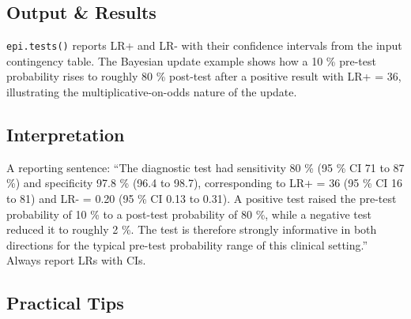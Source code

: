 \documentclass[
]{article}
\begin{document}
\subsection{Output \& Results}\label{output-results}

\texttt{epi.tests()} reports LR+ and LR- with their confidence intervals
from the input contingency table. The Bayesian update example shows how
a 10 \% pre-test probability rises to roughly 80 \% post-test after a
positive result with LR+ = 36, illustrating the multiplicative-on-odds
nature of the update.

\subsection{Interpretation}\label{interpretation}

A reporting sentence: ``The diagnostic test had sensitivity 80 \% (95 \%
CI 71 to 87 \%) and specificity 97.8 \% (96.4 to 98.7), corresponding to
LR+ = 36 (95 \% CI 16 to 81) and LR- = 0.20 (95 \% CI 0.13 to 0.31). A
positive test raised the pre-test probability of 10 \% to a post-test
probability of 80 \%, while a negative test reduced it to roughly 2 \%.
The test is therefore strongly informative in both directions for the
typical pre-test probability range of this clinical setting.'' Always
report LRs with CIs.

\subsection{Practical Tips}\label{practical-tips}
\end{document}
